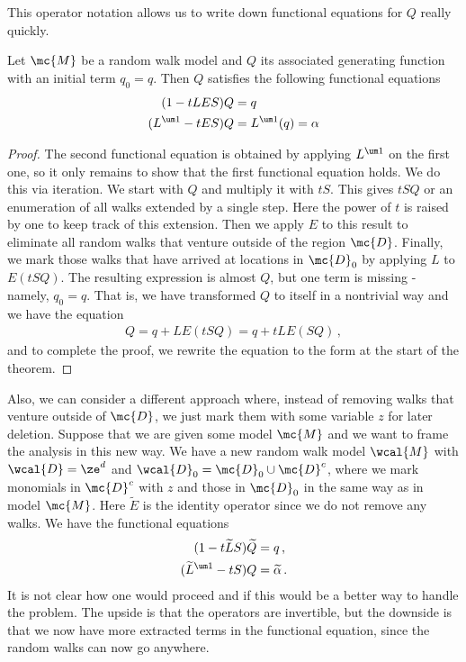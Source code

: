 This operator notation allows us to write down functional equations for $Q$ really quickly.
\begin{theorem} Let $\mc{M}$ be a random walk model and $Q$ its associated generating function with an initial term $q_0 = q$. Then $Q$ satisfies the following functional equations
\begin{align}
	(1-tLES)Q &= q\\
	(L^{\um 1}-tES)Q &= L^{\um 1}(q) = \alpha
\end{align}
\end{theorem}
\begin{proof} The second functional equation is obtained by applying $L^{\um 1}$ on the first one, so it only remains to show that the first functional equation holds. We do this via iteration. We start with $Q$ and multiply it with $tS$. This gives $tSQ$ or an enumeration of all walks extended by a single step. Here the power of $t$ is raised by one to keep track of this extension. Then we apply $E$ to this result to eliminate all random walks that venture outside of the region $\mc{D}$. Finally, we mark those walks that have arrived at locations in $\mc{D}_0$ by applying $L$ to $E(tSQ)$. The resulting expression is almost $Q$, but one term is missing - namely, $q_0 = q$. That is, we have transformed $Q$ to itself in a nontrivial way and we have the equation
\begin{align}
	Q = q + LE(tSQ) = q + tLE(SQ)\,,
\end{align}
and to complete the proof, we rewrite the equation to the form at the start of the theorem.
\end{proof}

\begin{example} Also, we can consider a different approach where, instead of removing walks that venture outside of $\mc{D}$, we just mark them with some variable $z$ for later deletion. Suppose that we are given some model $\mc{M}$ and we want to frame the analysis in this new way. We have a new random walk model $\wcal{M}$ with $\wcal{D} = \ze^d$ and $\wcal{D}_0 = \mc{D}_0 \cup \mc{D}^c$, where we mark monomials in $\mc{D}^c$ with $z$ and those in $\mc{D}_0$ in the same way as in model $\mc{M}$. Here $\widetilde{E}$ is the identity operator since we do not remove any walks. We have the functional equations
\begin{align}
(1-t\widetilde{L} S)\widetilde Q &= q\,,\\
(\widetilde{L}^{\um 1}-tS) Q &= \widetilde{\alpha}\,.
\end{align}
It is not clear how one would proceed and if this would be a better way to handle the problem. The upside is that the operators are invertible, but the downside is that we now have more extracted terms in the functional equation, since the random walks can now go anywhere.
\end{example}

